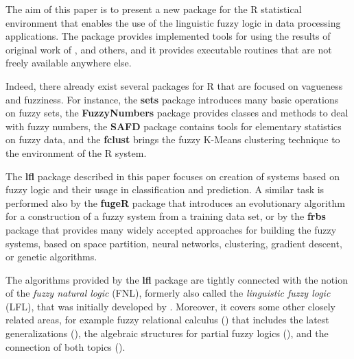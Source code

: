 \documentclass[review]{elsarticle}
\newcommand{\pkg}[1]{\textbf{#1}}
\newcommand{\proglang}[1]{#1}
\newcommand{\R}{\proglang{R}}
\begin{document}
The aim of this paper is to present a new package for the \R{} statistical environment
\citep{R2020} that enables the use of the linguistic fuzzy logic in data processing
applications. The package provides implemented tools for using the results of original work of
\cite{Novak08, Novak:PbLD, DvoStep:PbLD2015, StepBurda:FRBE_FSS}, and others, and it provides
executable routines that are not freely available anywhere else.

Indeed, there already exist several packages for \R{} that are focused on vagueness and fuzziness. For
instance, the \pkg{sets}
package \citep{setsPkg} introduces many basic operations on fuzzy sets, the \pkg{FuzzyNumbers}
package \citep{FuzzyNumbersPkg} provides classes and methods to deal with fuzzy numbers,
the \pkg{SAFD} package \citep{safdPkg} contains tools for elementary statistics on fuzzy data, and
the \pkg{fclust} \citep{fclustPkg} brings the fuzzy K-Means clustering technique to the environment of
the \R{} system.

The \pkg{lfl} package described in this paper focuses on creation of systems based on fuzzy logic and their
usage in classification and prediction. A similar task is performed also by the \pkg{fugeR}
package \citep{fugeRPkg} that introduces an evolutionary algorithm for a construction of a fuzzy system from
a training data set, or by the \pkg{frbs} package \citep{frbsPkg} that provides many widely
accepted approaches for building the fuzzy systems, based on space partition, neural networks,
clustering, gradient descent, or genetic algorithms.

The algorithms provided by the \pkg{lfl} package are tightly connected with the notion of
the \emph{fuzzy natural logic} (FNL), formerly also called the \emph{linguistic fuzzy logic} (LFL),
that was initially developed by \cite{Novak08}. Moreover, it covers some other closely related areas, for example fuzzy relational calculus  (\cite{BandlerKohout78,Belohlavek_book2002,Behounek:Compositions})  that includes the latest generalizations (\cite{Cao2017, Cao2017b}), the algebraic structures for partial fuzzy logics (\cite{BehounekNovak:IEEE15, BehounekDankova:IPMU16}), and the connection of both topics (\cite{Step_etal_Dragon_IJAR2019}).
\end{document}
